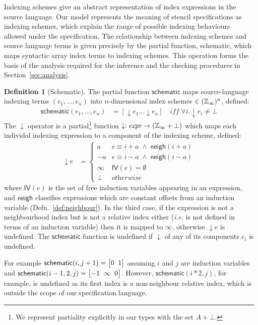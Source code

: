 \documentclass[9pt]{sigplanconf}
\newcounter{block}
\theoremstyle{definition}
\newtheorem{definition}[block]{Definition}
\newcommand{\ie}{\emph{i.e.}}
\newcommand{\neigh}{\textsf{neigh}}
\newcommand{\vtwoh}[2]{\setlength{\arraycolsep}{0em}
\left[\begin{array}{cc}#1 \; & \; #2\end{array}\right]}
\newcommand{\vthreeh}[3]{\setlength{\arraycolsep}{0em}
\left[\begin{array}{ccc}#1 \; & \; #2 \; & \; #3\end{array}\right]}
\begin{document}
Indexing schemes give an abstract
representation of index expressions in the source language.
Our model represents the meaning of stencil specifications
as indexing schemes, which explain the range of possible
indexing behaviours allowed under the specification.
The relationship between indexing schemes and source language
terms is given precisely by the partial function, \textsf{schematic}, which
maps syntactic array index terms to indexing schemes. This
operation forms the basis of the analysis required for the inference
and the checking procedures in Section~\ref{sec:analysis}. 

\begin{definition}[Schematic]
The partial function $\textsf{schematic}$ maps 
source-language indexing terms $(e_1, \ldots, e_n)$
into $n$-dimensional index schemes 
$\in (\mathbb{Z}_\infty)^n$, defined:
%
\begin{align*}
\mathsf{schematic}(e_1, \ldots, e_n) & = 
[\downarrow\!e_1 \ldots \downarrow\!e_n ] 
\quad \textit{iff} \; \forall i . \downarrow\!e_i \neq \bot 
\end{align*}
%
The $\downarrow$ operator is a partial\footnote{We represent
  partiality explicitly in our types with the set $A + \bot$.} function 
 $\downarrow : \textit{expr} \rightarrow (\mathbb{Z}_\infty + \bot)$
which maps each individal indexing expression to a component of
the indexing scheme, defined: 
\begin{align*}
\downarrow\!e
 & =  \begin{cases}
a & e \equiv i + a \; \wedge \; \mathsf{neigh}(i + a) \\
-a & e \equiv i - a \; \wedge \; \mathsf{neigh}(i - a) \\
\infty & \textit{$\mathsf{IV}(e) = \emptyset$} \\
\bot   & \textit{otherwise}
\end{cases}
\end{align*}
where $\mathsf{IV}(e)$ is the set of free induction variables
appearing in an expression, and $\neigh{}$ classifies expressions which 
are constant offsets from an induction variable
(Defn.~\ref{def:neighbour}). In the third case, 
if the expression is not a neighbourhood index but is not
a relative index either (\ie{} is not defined in terms
of an induction variable) then it is mapped to $\infty$, otherwise
$\downarrow\!e$ is undefined. The $\mathsf{schematic}$ function
is undefined if $\downarrow$ of any of its components $e_i$ is
undefined. 

For example $\textsf{schematic}(i, j+1) = \vtwoh{0}{1}$ assuming
$i$ and $j$ are induction variables and $\textsf{schematic}(i-1, 2, j)
 = \vthreeh{-1}{\infty}{0}$. However, $\textsf{schematic}(i*2, j)$, for
 example, is
 undefined as its first index is a non-neighbour relative index, which 
 is outside the scope of our specification language.
\end{definition}
\end{document}
